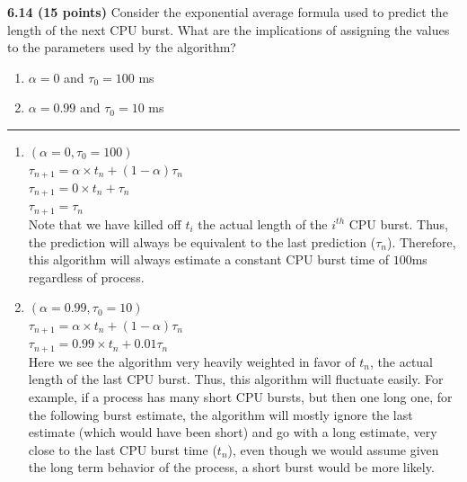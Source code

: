 \documentclass[12pt]{jhwhw}
\begin{document}
\clearpage
\textbf{6.14 (15 points)} Consider the exponential average formula used to
	predict the length of the next CPU burst. What are the implications of assigning
	the values to the parameters used by the algorithm?
	\begin{enumerate}
		\item $\alpha=0$ and $\tau_0=100$ ms
		\item $\alpha=0.99$ and $\tau_ 0=10$ ms
	\end{enumerate}
\textcolor[RGB]{240,240,240}{\rule{\textwidth}{0.5pt}}\bigbreak

	\begin{addmargin}[1em]{}
		\begin{enumerate}
			\item $(\alpha=0,\tau_0=100)$ \\
				$\tau_{n+1} = \alpha\times t_n + (1-\alpha)\tau_n$ \\
				$\tau_{n+1} = 0\times t_n + \tau_n$ \\
				$\tau_{n+1} = \tau_n$ \\
				Note that we have killed off $t_i$ the actual length of
				the $i^{th}$ CPU burst. Thus, the prediction will always be
				equivalent to the last prediction ($\tau_n$).
				Therefore, this algorithm will always estimate a constant
				CPU burst time of $100$ms regardless of process.

			\item $(\alpha=0.99,\tau_0=10)$ \\
				$\tau_{n+1} = \alpha\times t_n + (1-\alpha)\tau_n$ \\
				$\tau_{n+1} = 0.99\times t_n + 0.01\tau_n$ \\
				Here we see the algorithm very heavily weighted in favor of $t_n$, the 
				actual length of the last CPU burst. Thus, this algorithm will
				fluctuate easily. For example, if a process has many short CPU bursts,
				but then one long one, for the following burst estimate, 
				the algorithm will mostly ignore the last estimate
				(which would have been short) and go with a long estimate, very close
				to the last CPU burst time ($t_n$), even though we would assume given
				the long term behavior of the process, a short burst would be more likely.
		\end{enumerate}
	\end{addmargin}
	\bigbreak
\end{document}

